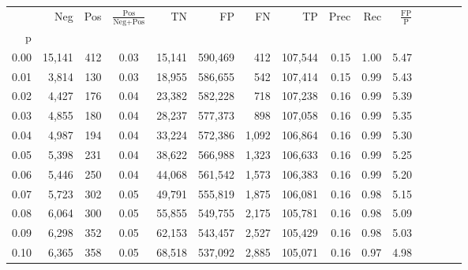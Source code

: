 \begin{tabular}{rrrcrrrrrrrrrrr}
\toprule
{} &     Neg &    Pos & $\frac{\text{Pos}}{\text{Neg}+\text{Pos}}$ &       TN &       FP &       FN &       TP &  Prec &   Rec & $\frac{\text{FP}}{\text{P}}$ \\
p    &         &        &                                            &          &          &          &          &       &       &                              \\
\midrule
0.00 &  15,141 &    412 &                                       0.03 &   15,141 &  590,469 &      412 &  107,544 &  0.15 &  1.00 &                         5.47 \\
0.01 &   3,814 &    130 &                                       0.03 &   18,955 &  586,655 &      542 &  107,414 &  0.15 &  0.99 &                         5.43 \\
0.02 &   4,427 &    176 &                                       0.04 &   23,382 &  582,228 &      718 &  107,238 &  0.16 &  0.99 &                         5.39 \\
0.03 &   4,855 &    180 &                                       0.04 &   28,237 &  577,373 &      898 &  107,058 &  0.16 &  0.99 &                         5.35 \\
0.04 &   4,987 &    194 &                                       0.04 &   33,224 &  572,386 &    1,092 &  106,864 &  0.16 &  0.99 &                         5.30 \\
0.05 &   5,398 &    231 &                                       0.04 &   38,622 &  566,988 &    1,323 &  106,633 &  0.16 &  0.99 &                         5.25 \\
0.06 &   5,446 &    250 &                                       0.04 &   44,068 &  561,542 &    1,573 &  106,383 &  0.16 &  0.99 &                         5.20 \\
0.07 &   5,723 &    302 &                                       0.05 &   49,791 &  555,819 &    1,875 &  106,081 &  0.16 &  0.98 &                         5.15 \\
0.08 &   6,064 &    300 &                                       0.05 &   55,855 &  549,755 &    2,175 &  105,781 &  0.16 &  0.98 &                         5.09 \\
0.09 &   6,298 &    352 &                                       0.05 &   62,153 &  543,457 &    2,527 &  105,429 &  0.16 &  0.98 &                         5.03 \\
0.10 &   6,365 &    358 &                                       0.05 &   68,518 &  537,092 &    2,885 &  105,071 &  0.16 &  0.97 &                         4.98 \\

\end{tabular}
